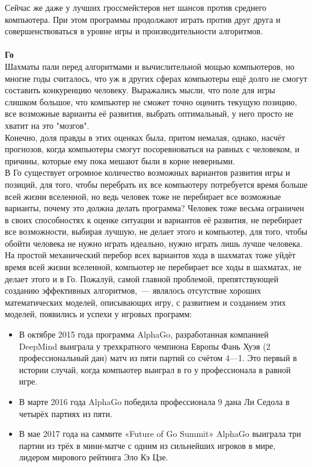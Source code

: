 Сейчас же даже у лучших гроссмейстеров нет шансов против среднего компьютера\cite{chess_human_has_no_chance}. При этом программы продолжают играть против друг друга и совершенствоваться в уровне игры и производительности алгоритмов.\\\\

\textbf{Го}\\
Шахматы пали перед алгоритмами и вычислительной мощью компьютеров, но многие годы считалось, что уж в других сферах компьютеры ещё долго не смогут составить конкуренцию человеку. Выражались мысли, что поле для игры слишком большое, что компьютер не сможет точно оценить текущую позицию, все возможные варианты её развития, выбрать оптимальный, у него просто не хватит на это "мозгов"\cite{go_is_hard}\cite{go_is_hard2}.\\

Конечно, доля правды в этих оценках была, притом немалая, однако, насчёт прогнозов, когда компьютеры смогут посоревноваться на равных с человеком, и причины, которые ему пока мешают были в корне неверными.\\

В Го существует огромное количество возможных вариантов развития игры и позиций, для того, чтобы перебрать их все компьютеру потребуется время больше всей жизни вселенной, но ведь человек тоже не перебирает все возможные варианты, почему это должна делать программа? Человек тоже весьма ограничен в своих способностях к оценке ситуации и вариантов её развития, не перебирает все возможности, выбирая лучшую, не делает этого и компьютер, для того, чтобы обойти человека не нужно играть идеально, нужно играть лишь лучше человека. На простой механический перебор всех вариантов хода в шахматах тоже уйдёт время всей жизни вселенной, компьютер не перебирает все ходы в шахматах, не делает этого и в Го. Пожалуй, самой главной проблемой, препятствующей созданию эффективных алгоритмов,~--- являлось отсутствие хороших математических моделей, описывающих игру, с развитием и созданием этих моделей, появились и успехи у игровых программ:\\

\begin{itemize}
    \item В октябре 2015 года программа AlphaGo, разработанная компанией DeepMind выиграла у трехкратного чемпиона Европы Фань Хуэя (2 профессиональный дан) матч из пяти партий со счётом 4—1. Это первый в истории случай, когда компьютер выиграл в го у профессионала в равной игре.
    \item В марте 2016 года AlphaGo победила профессионала 9 дана Ли Седола в четырёх партиях из пяти.
    \item В мае 2017 года на саммите «Future of Go Summit» AlphaGo выиграла три партии из трёх в мини-матче с одним из сильнейших игроков в мире, лидером мирового рейтинга Эло Кэ Цзе.\\
\end{itemize}

